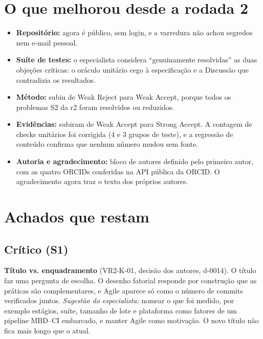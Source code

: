 \documentclass[10pt,a4paper]{article}
\begin{document}
\section{O que melhorou desde a rodada 2}
\begin{itemize}
\item \textbf{Repositório:} agora é público, sem login, e a varredura não achou segredos nem e-mail pessoal.
\item \textbf{Suíte de testes:} o especialista considera ``genuinamente resolvidas'' as duas objeções críticas: o oráculo unitário cego à especificação e a Discussão que contradizia os resultados.
\item \textbf{Método:} subiu de Weak Reject para Weak Accept, porque todos os problemas S2 da r2 foram resolvidos ou reduzidos.
\item \textbf{Evidências:} subiram de Weak Accept para Strong Accept. A contagem de checks unitários foi corrigida (4 e 3 grupos de teste), e a regressão de conteúdo confirma que nenhum número mudou sem fonte.
\item \textbf{Autoria e agradecimento:} bloco de autores definido pelo primeiro autor, com as quatro ORCIDs conferidas na API pública da ORCID. O agradecimento agora traz o texto dos próprios autores.
\end{itemize}

\section{Achados que restam}

\subsection{Crítico (S1)}
\begin{panel}
\textbf{Título vs. enquadramento} (VR2-K-01, decisão dos autores, d-0014). O título faz uma pergunta de escolha. O desenho fatorial responde por construção que as práticas são complementares, e Agile aparece só como o número de commits verificados juntos. \emph{Sugestão do especialista:} nomear o que foi medido, por exemplo estágios, suíte, tamanho de lote e plataforma como fatores de um pipeline MBD--CI embarcado, e manter Agile como motivação. O novo título não fica mais longo que o atual.
\end{panel}
\end{document}
